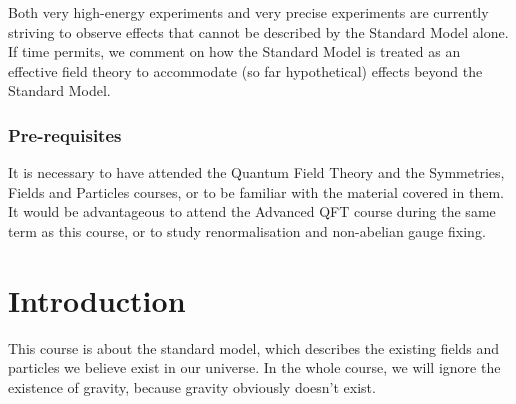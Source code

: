 \documentclass[a4paper]{article}
\begin{document}
{Both very high-energy experiments and very precise experiments are currently striving to observe effects that cannot be described by the Standard Model alone. If time permits, we comment on how the Standard Model is treated as an effective field theory to accommodate (so far hypothetical) effects beyond the Standard Model.

\subsubsection*{Pre-requisites}
It is necessary to have attended the Quantum Field Theory and the Symmetries, Fields and Particles courses, or to be familiar with the material covered in them. It would be advantageous to attend the Advanced QFT course during the same term as this course, or to study renormalisation and non-abelian gauge fixing.
}
\tableofcontents

\setcounter{section}{-1}
\section{Introduction}
This course is about the standard model, which describes the existing fields and particles we believe exist in our universe. In the whole course, we will ignore the existence of gravity, because gravity obviously doesn't exist.
\end{document}
